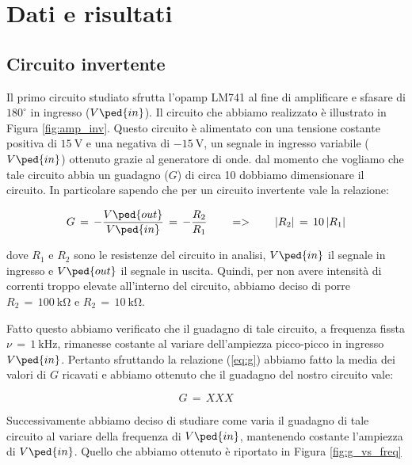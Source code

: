 \section*{Dati e risultati}

\subsection*{Circuito invertente}

Il primo circuito studiato sfrutta l'opamp LM741 al fine di amplificare e sfasare di $180^\circ$ in ingresso ($V\ped{in}$). Il circuito che abbiamo realizzato è illustrato in Figura \ref{fig:amp_inv}.
Questo circuito è alimentato con una tensione costante positiva di $\SI{+15}{\volt}$ e una negativa di $\SI{-15}{\volt}$, un segnale in ingresso variabile ($V\ped{in}$) ottenuto grazie al generatore di onde.
dal momento che vogliamo che tale circuito abbia un guadagno ($G$) di circa 10 dobbiamo dimensionare il circuito. In particolare sapendo che per un circuito invertente vale la relazione:

\begin{equation}
        G\,=\,-\frac{V\ped{out}}{V\ped{in}}\,=\,-\frac{R_2}{R_1} \qquad => \qquad |R_2|\,=\,10\,|R_1|
        \label{eq:g}
\end{equation}

dove $R_1$ e $R_2$ sono le resistenze del circuito in analisi, $V\ped{in}$ il segnale in ingresso e $V\ped{out}$ il segnale in uscita. Quindi, per non avere intensità di correnti troppo elevate all'interno del circuito, abbiamo deciso di porre $R_2\,=\,\SI{100}{\kilo\ohm}$ e $R_2\,=\,\SI{10}{\kilo\ohm}$.

Fatto questo abbiamo verificato che il guadagno di tale circuito, a frequenza fissta $\nu\,=\,\SI{1}{\kilo\hertz}$, rimanesse costante al variare dell'ampiezza picco-picco in ingresso $V\ped{in}$. Pertanto sfruttando la relazione (\ref{eq:g}) abbiamo fatto la media dei valori di $G$ ricavati e abbiamo ottenuto che il guadagno del nostro circuito vale:

\begin{equation}
        G\,=\, XXX
\end{equation}

Successivamente abbiamo deciso di studiare come varia il guadagno di tale circuito al variare della frequenza di $V\ped{in}$, mantenendo costante l'ampiezza di $V\ped{in}$. Quello che abbiamo ottenuto è riportato in Figura \ref{fig:g_vs_freq}

